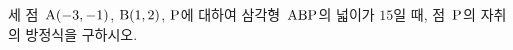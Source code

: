 세 점~$\mathrm{A}(-3{,}\mkern3mu\mathopen{}-1)$, $\mathrm{B}(1{,}\mkern3mu\mathopen{}2)$, $\mathrm{P}$에 대하여 삼각형~$\mathrm{ABP}$의 넓이가 $15$일 때, 점~$\mathrm{P}$의 자취의 방정식을 구하시오. 
